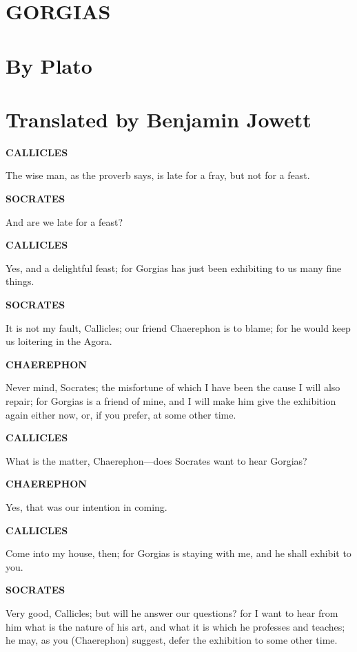 \documentclass[11pt,letter]{article}
\begin{document}
 \section{GORGIAS}\section{By Plato}\section{Translated by Benjamin Jowett}  
\par \textbf{CALLICLES}
\par   The wise man, as the proverb says, is late for a fray, but not for a feast.

\par \textbf{SOCRATES}
\par   And are we late for a feast?

\par \textbf{CALLICLES}
\par   Yes, and a delightful feast; for Gorgias has just been exhibiting to us many fine things.

\par \textbf{SOCRATES}
\par   It is not my fault, Callicles; our friend Chaerephon is to blame; for he would keep us loitering in the Agora.

\par \textbf{CHAEREPHON}
\par   Never mind, Socrates; the misfortune of which I have been the cause I will also repair; for Gorgias is a friend of mine, and I will make him give the exhibition again either now, or, if you prefer, at some other time.

\par \textbf{CALLICLES}
\par   What is the matter, Chaerephon—does Socrates want to hear Gorgias?

\par \textbf{CHAEREPHON}
\par   Yes, that was our intention in coming.

\par \textbf{CALLICLES}
\par   Come into my house, then; for Gorgias is staying with me, and he shall exhibit to you.

\par \textbf{SOCRATES}
\par   Very good, Callicles; but will he answer our questions? for I want to hear from him what is the nature of his art, and what it is which he professes and teaches; he may, as you (Chaerephon) suggest, defer the exhibition to some other time.
\end{document}
